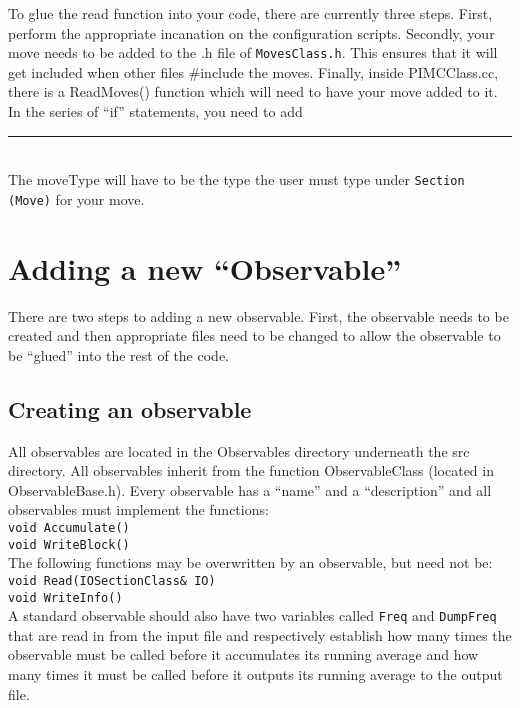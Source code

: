 \documentclass{book}
\begin{document}
To glue the read function into your code, there are currently three
steps. First, perform the appropriate incanation on the configuration scripts.
Secondly,  your move needs
to be added to the .h file of \texttt{MovesClass.h}. This ensures that it will
get included when other files \#include the moves. Finally, inside
PIMCClass.cc, there is a ReadMoves() function which will need to have your
move added to it.  In the series of ``if'' statements, you need to add
\\
\rule{0.6cm}{0cm}\\
The moveType will have to be the type the user must type under
\texttt{Section (Move)} for your move.




\section{Adding a new ``Observable''}
There are two steps to adding a new observable. First, the observable
needs to be created and then appropriate files need to be changed to
allow the observable to be ``glued'' into the rest of the code.
\subsection{Creating an observable}
All observables are located in the Observables directory underneath
the src directory. All observables inherit from the function
ObservableClass (located in ObservableBase.h). Every observable has a
``name'' and a ``description'' and all
observables must implement the functions: \\
\texttt{void Accumulate()} \\
\texttt{void WriteBlock()} \\ 
The following functions may be overwritten by an observable, but need
not be: \\
\texttt{void Read(IOSectionClass\& IO)} \\
\texttt{void WriteInfo()} \\
A standard observable should also have two variables called \texttt{Freq} and
\texttt{DumpFreq} that are read in from the input file and respectively
establish how many times the observable must be called before it
accumulates its running average and how many times it must be called
before it outputs its running average to the output file.
\end{document}
